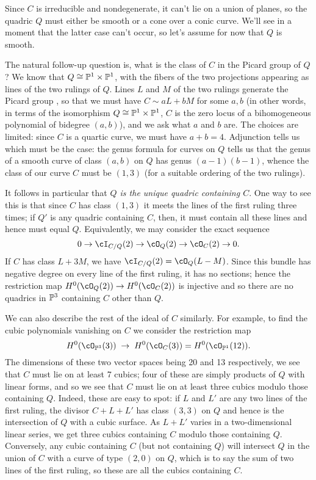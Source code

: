 Since $C$ is irreducible and nondegenerate, it can't lie on a union of planes, so the quadric $Q$ must either be smooth or a cone over a conic curve. We'll see in a moment that the latter case can't occur, so let's assume for now that $Q$ is smooth. 

The natural follow-up question is, what is the class of $C$ in the Picard group of $Q$? We know that $Q \cong \PP^1 \times \PP^1$, with the fibers of the two projections appearing as lines of the two rulings of $Q$. Lines $L$ and $M$ of the two rulings generate the Picard group \cite[***]{H}, so that we must have $C \sim aL + bM$ for some $a, b$ (in other words, in terms of the isomorphism $Q \cong \PP^1 \times \PP^1$, $C$ is the zero locus of a bihomogeneous polynomial of bidegree $(a,b)$), and we ask what $a$ and $b$ are. The choices are limited: since $C$ is a quartic curve, we must have $a+b = 4$. Adjunction \cite[***]{H} tells us which must be the case: the genus formula for curves on $Q$ tells us that the genus of a smooth curve of class $(a,b)$ on $Q$ has genus $(a-1)(b-1)$, whence the class of our curve $C$ must be $(1,3)$ (for a suitable ordering of the two rulings).

It follows in particular that \emph{$Q$ is the unique quadric containing $C$}. One way to see this is that since $C$ has class $(1,3)$ it meets the lines of the first ruling three times; if $Q'$ is any quadric containing $C$, then, it must contain all these lines and hence must equal $Q$. Equivalently, we may consider the exact sequence
$$
0 \to \cI_{C/Q}(2) \to \cO_Q(2)  \to \cO_C(2) \to 0.
$$
If $C$ has class $L+3M$, we have $\cI_{C/Q}(2) = \cO_{Q}(L-M)$. Since this bundle has negative degree on every line of the first ruling, it has no sections; hence the restriction map $H^0(\cO_Q(2))  \to H^0(\cO_C(2))$ is injective and so there are no  quadrics in $\PP^3$ containing $C$ other than $Q$.

We can also describe the rest of the ideal of $C$ similarly. For example, to find the cubic polynomials vanishing on $C$ we consider the restriction map
$$
H^0(\cO_{\PP^3}(3)) \; \to \; H^0(\cO_{C}(3)) = H^0(\cO_{\PP^1}(12)).
$$
The dimensions of these two vector spaces being 20 and 13 respectively, we see that $C$ must lie on at least 7 cubics; four of these are simply products of $Q$ with linear forms, and so we see that $C$ must lie on at least three cubics modulo those containing $Q$. Indeed, these are easy to spot: if $L$ and $L'$ are any two lines of the first ruling, the divisor $C + L + L'$ has class $(3,3)$ on $Q$ and hence is the intersection of $Q$ with a cubic surface. As $L+L'$ varies in a two-dimensional linear series, we get three cubics containing $C$ modulo those containing $Q$. Conversely, any cubic containing $C$ (but not containing $Q$) will intersect $Q$ in the union of $C$ with a curve of type $(2,0)$ on $Q$, which is to say the sum of two lines of the first ruling, so these are all the cubics containing $C$.

